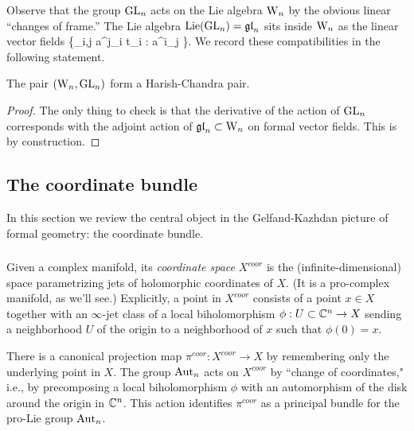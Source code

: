 \documentclass[10pt]{amsart}
\def\brian{\textcolor{blue}{BW: }\textcolor{blue}}
\begin{document}
Observe that the group ${\rm GL}_n$ acts on the Lie algebra ${{\rm W}_n}$ by the obvious linear ``changes of frame.''
The Lie algebra ${\rm Lie}({{\rm GL}_n}) = {\mathfrak{gl}}_n$ sits inside ${{\rm W}_n}$ as the linear vector fields
\ben
\left\{\sum_{i,j} a^j_i t_i  \; : \; a^{i}_j \in \CC \right\}.
\een 
We record these compatibilities in the following statement.

\begin{lem} 
The pair $({{\rm W}_n}, {\rm GL}_n)$ form a Harish-Chandra pair.
\end{lem}
\begin{proof} The only thing to check is that the derivative of the
  action of ${\rm GL}_n$ corresponds with the adjoint action of ${\mathfrak{gl}}_n
  \subset {{\rm W}_n}$ on formal vector fields. This is by construction. 
\end{proof}

\subsection{The coordinate bundle}

In this section we review the central object in the Gelfand-Kazhdan
picture of formal geometry: the coordinate bundle.


\subsubsection{}

Given a complex manifold, its {\em coordinate space} $X^{coor}$ is the (infinite-dimensional) space parametrizing jets of holomorphic coordinates of $X$. 
(It is a pro-complex manifold, as we'll see.) 
Explicitly, a point in $X^{coor}$ consists of a point $x \in X$ 
together with an $\infty$-jet class of a local biholomorphism $\phi : U \subset \mathbb C^n \to X$ 
sending a neighborhood $U$ of the origin to a neighborhood of $x$ such that $\phi(0) = x$. 

There is a canonical projection map $\pi^{coor} : X^{coor} \to X$ by remembering only the underlying point in $X$. 
The group ${\rm Aut}_n$ acts on $X^{coor}$ by ``change of coordinates," 
i.e., by precomposing a local biholomorphism $\phi$ with an automorphism of the disk around the origin in $\mathbb C^n$.
This action identifies $\pi^{coor}$ as a principal bundle for the pro-Lie group ${\rm Aut}_n$. 
\end{document}
